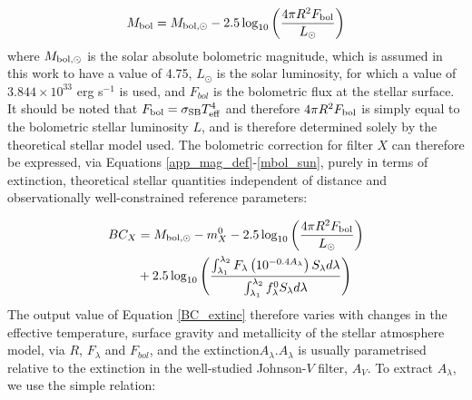 \documentclass[12pt, a4paper]{report}
\begin{document}
\begin{equation}
M_{\textnormal{bol}} = M_{\textnormal{bol},\odot} - 2.5 \log_{10} \left( \frac{4\pi R^{2}F_{\textnormal{bol}}}{L_{\odot}} \right)
\label{mbol_sun}
\end{equation}
where $M_{\textnormal{bol},\odot}$ is the solar absolute bolometric magnitude, which is assumed in this work to have a value of 4.75, $L_{\odot}$ is the solar luminosity, for which a value of $3.844 \times 10^{33}$ erg s$^{-1}$ is used, and $F_{bol}$ is the bolometric flux at the stellar surface. It should be noted that $F_{\textnormal{bol}} = \sigma_{\textnormal{SB}} T_{\textnormal{eff}}^{4}$ and therefore $4\pi R^{2}F_{\textnormal{bol}}$ is simply equal to the bolometric stellar luminosity $L$, and is therefore determined solely by the theoretical stellar model used. The bolometric correction for filter $X$ can therefore be expressed, via Equations \ref{app_mag_def}-\ref{mbol_sun}, purely in terms of extinction, theoretical stellar quantities independent of distance and observationally well-constrained reference parameters:

\begin{align}
\begin{split}
BC_{X} &= M_{\textnormal{bol},\odot} - m_{X}^{0} - 2.5 \log_{10} \left( \frac{4\pi R^{2}F_{\textnormal{bol}}}{L_{\odot}} \right) \\
&+ 2.5 \log_{10} \left( \frac{\int_{\lambda_{1}}^{\lambda_{2}} F_{\lambda} \left( 10^{-0.4 A_{\lambda}} \right) S_{\lambda} d\lambda}{\int_{\lambda_{1}}^{\lambda_{2}} f_{\lambda}^{0} S_{\lambda} d\lambda} \right)
\label{BC_extinc}
\end{split}
\end{align}
The output value of Equation \ref{BC_extinc} therefore varies with changes in the effective temperature, surface gravity and metallicity of the stellar atmosphere model, via $R$, $F_{\lambda}$ and $F_{bol}$, and the extinction$ A_{\lambda}$.$A_{\lambda}$ is usually parametrised relative to the extinction in the well-studied Johnson-$V$ filter, $A_{V}$. To extract $A_{\lambda}$, we use the simple relation:

\end{document}
